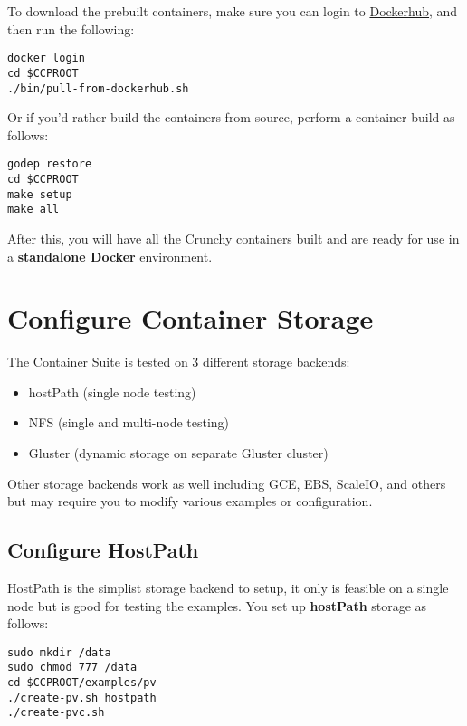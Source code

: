 \documentclass[letterpaper,12pt]{article}
\let\stdsection\section
\renewcommand\section{\newpage\stdsection}
\begin{document}
To download the prebuilt containers, make sure you can login to \href{https://hub.docker.com/}{Dockerhub}, and then run the following:
\vspace{.75em}
\begin{lstlisting}
docker login
cd $CCPROOT
./bin/pull-from-dockerhub.sh
\end{lstlisting}

Or if you'd rather build the containers from source, perform a container build as follows:
\vspace{.75em}
\begin{lstlisting}
godep restore
cd $CCPROOT
make setup
make all
\end{lstlisting}

After this, you will have all the Crunchy containers built and are ready for use in a \textbf{standalone Docker} environment.

\section{Configure Container Storage}\label{/_configure_container_storage}

The Container Suite is tested on 3 different storage backends:

\begin{itemize}
    \item hostPath (single node testing) 
    \item NFS (single and multi-node testing) 
    \item Gluster (dynamic storage on separate Gluster cluster) 
\end{itemize}
Other storage backends work as well including GCE, EBS, ScaleIO, and others but may require you to modify various examples or configuration.

\subsection{Configure HostPath}\label{/_configure_container_storage/_configure_hostpath}

HostPath is the simplist storage backend to setup, it only is feasible on a single node but is good for testing the examples. You set up \textbf{hostPath} storage as follows:
\vspace{.75em}
\begin{lstlisting}
sudo mkdir /data
sudo chmod 777 /data
cd $CCPROOT/examples/pv
./create-pv.sh hostpath
./create-pvc.sh
\end{lstlisting}
\end{document}
